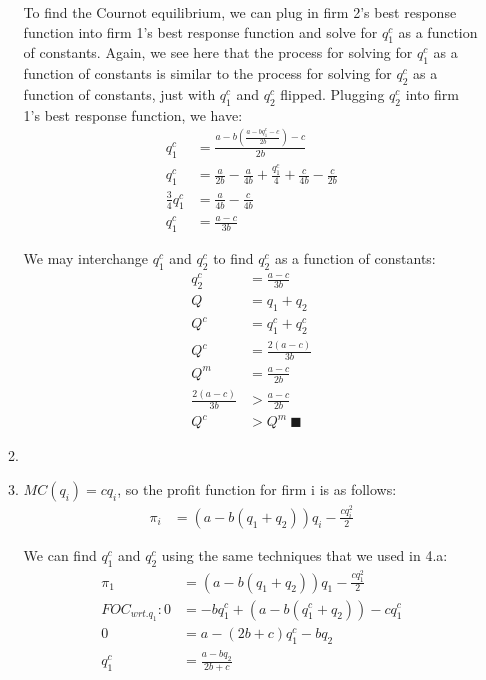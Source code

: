 \documentclass[12pt,letterpaper]{article}
\begin{document}
\begin{enumerate}
\begin{enumerate}
    To find the Cournot equilibrium, we can plug in firm 2's best response  function into firm 1's best response function and solve for $q_1^c$ as a function of constants. Again, we see here that the process for solving for $q_1^c$ as a function of constants is similar to the process for solving for $q_2^c$ as a function of constants, just with $q_1^c$ and $q_2^c$ flipped. Plugging $q_2^c$ into firm 1's best response function, we have:
    \begin{align*}
        q_1^c &= \frac{a - b(\frac{a - bq_1^c - c}{2b}) - c}{2b}\\
        q_1^c &= \frac{a}{2b} - \frac{a}{4b} + \frac{q_1^c}{4} + \frac{c}{4b} - \frac{c}{2b}\\
        \frac{3}{4}q_1^c &= \frac{a}{4b} - \frac{c}{4b}\\
        q_1^c &= \frac{a-c}{3b}
    \end{align*}
    
    We may interchange $q_1^c$ and $q_2^c$ to find $q_2^c$ as a function of constants:
    \begin{align*}
        q_2^c &= \frac{a-c}{3b}\\
        Q &= q_1 + q_2\\
        Q^c &= q_1^c + q_2^c\\
        Q^c &= \frac{2(a-c)}{3b}\\
        Q^m &= \frac{a-c}{2b}\\
        \frac{2(a-c)}{3b} &> \frac{a-c}{2b}\\
        Q^c &> Q^m \ \blacksquare
    \end{align*}
    
    \item 
    
    \item $MC(q_i) = cq_i$, so the profit function for firm i is as follows:
    \begin{align*}
        \pi_i &= (a - b(q_1 + q_2))q_i - \frac{cq_i^2}{2}
    \end{align*}
    
    We can find $q_1^c$ and $q_2^c$ using the same techniques that we used in 4.a:
    \begin{align*}
        \pi_1 &= (a - b(q_1 + q_2))q_1 - \frac{cq_1^2}{2}\\
        FOC_{wrt.q_1}: 0 &= -bq_1^c + (a-b(q_1^c + q_2)) - cq_1^c\\
        0 &= a - (2b + c)q_1^c - bq_2\\
        q_1^c &= \frac{a - bq_2}{2b + c}
    \end{align*}
    

\end{enumerate}
\end{enumerate}
\end{document}
